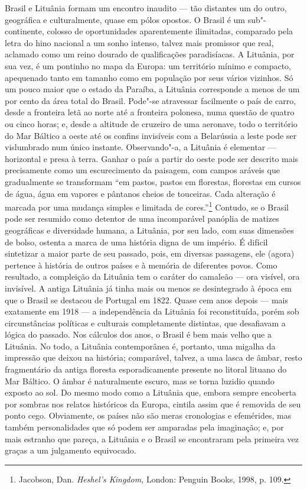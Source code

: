 \noindent{}Brasil e Lituânia formam um encontro inaudito --- tão distantes um do
outro, geográfica e culturalmente, quase em pólos opostos. O Brasil é um
sub"-continente, colosso de oportunidades aparentemente ilimitadas,
comparado pela letra do hino nacional a um sonho intenso, talvez mais
promissor que real, aclamado como um reino dourado de qualificações
paradisíacas. A Lituânia, por sua vez, é um pontinho no mapa da Europa:
um território mínimo e compacto, apequenado tanto em tamanho como em
população por seus vários vizinhos. Só um pouco maior que o estado da
Paraíba, a Lituânia corresponde a menos de um por cento da área total do
Brasil. Pode"-se atravessar facilmente o país de carro, desde a fronteira
letã ao norte até a fronteira polonesa, numa questão de quatro ou cinco
horas; e, desde a altitude de cruzeiro de uma aeronave, todo o
território do Mar Báltico a oeste até os confins invisíveis com a
Belarússia a leste pode ser vislumbrado num único instante.
Observando"-a, a Lituânia é elementar --- horizontal e presa à terra.
Ganhar o país a partir do oeste pode ser descrito mais precisamente como
um escurecimento da paisagem, com campos aráveis que gradualmente se
transformam ``em pastos, pastos em florestas, florestas em cursos de
água, água em vapores e pântanos cheios de touceiras. Cada alteração é
marcada por uma mudança simples e limitada de cores.''\footnote{Jacobson,
  Dan. \emph{Heshel's Kingdom,} London: Penguin Books, 1998, p. 109.}
Contudo, se o Brasil pode ser resumido como detentor de uma incomparável
panóplia de matizes geográficas e diversidade humana, a Lituânia, por
seu lado, com suas dimensões de bolso, ostenta a marca de uma história
digna de um império. É difícil sintetizar a maior parte de seu passado,
pois, em diversas passagens, ele (agora) pertence à história de outros
países e à memória de diferentes povos. Como resultado, a compleição da
Lituânia tem o caráter do camaleão --- ora visível, ora invisível. A
antiga Lituânia já tinha mais ou menos se desintegrado à época em que o
Brasil se destacou de Portugal em 1822. Quase cem anos depois --- mais
exatamente em 1918 --- a independência da Lituânia foi reconstituída,
porém sob circunstâncias políticas e culturais completamente distintas,
que desafiavam a lógica do passado. Nos cálculos dos anos, o Brasil é
bem mais velho que a Lituânia. No todo, a Lituânia contemporânea é,
portanto, uma migalha da impressão que deixou na história; comparável,
talvez, a uma lasca de âmbar, resto fragmentário da antiga floresta
esporadicamente presente no litoral lituano do Mar Báltico. O âmbar é
naturalmente escuro, mas se torna luzidio quando exposto ao sol. Do
mesmo modo como a Lituânia que, embora sempre encoberta por sombras nos
relatos históricos da Europa, cintila assim que é removida de seu ponto
cego. Obviamente, os países não são meras cronologias e efemérides, mas
também personalidades que só podem ser amparadas pela imaginação; e, por
mais estranho que pareça, a Lituânia e o Brasil se encontraram pela
primeira vez graças a um julgamento equivocado.

